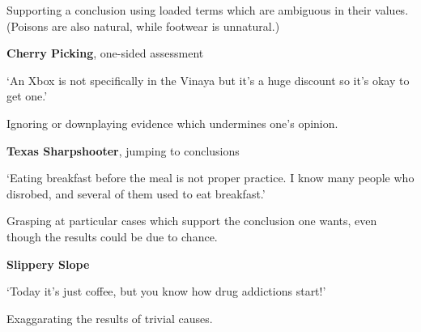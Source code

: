 Supporting a conclusion using loaded terms which are ambiguous in their
values. (Poisons are also natural, while footwear is unnatural.)

\textbf{Cherry Picking}, one-sided assessment

`An Xbox is not specifically in the Vinaya but it's a huge discount so
it's okay to get one.'

Ignoring or downplaying evidence which undermines one's opinion.

\textbf{Texas Sharpshooter}, jumping to conclusions

`Eating breakfast before the meal is not proper practice. I know many
people who disrobed, and several of them used to eat breakfast.'

Grasping at particular cases which support the conclusion one wants,
even though the results could be due to chance.

\textbf{Slippery Slope}

`Today it's just coffee, but you know how drug addictions start!'

Exaggarating the results of trivial causes.

